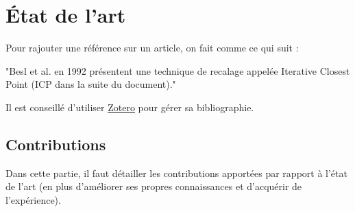 \chapter{État de l'art}
Pour rajouter une référence sur un article, on fait comme ce qui suit :

"Besl et al. en 1992 \cite{besl_method_1992} présentent une technique de recalage appelée Iterative Closest Point (ICP dans la suite du document)."

Il est conseillé d'utiliser \href{https://www.zotero.org/}{Zotero} pour gérer sa bibliographie.

\section{Contributions}
Dans cette partie, il faut détailler les contributions apportées par rapport à l'état de l'art (en plus d'améliorer ses propres connaissances et d'acquérir de l'expérience).

